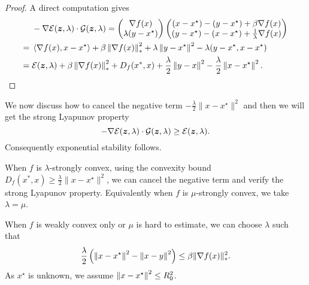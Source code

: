 \documentclass[10pt]{amsart}
\begin{document}
\begin{proof}
A direct computation gives 
\begin{equation}\label{eq:A-HNAG}
\begin{split}
	&-\nabla \mathcal E(\boldsymbol z, \lambda) \cdot \mathcal G(\boldsymbol z, \lambda) 
= 
\begin{pmatrix}
\nabla f(x)\\
 \lambda (y-x^{\star})
\end{pmatrix}
\begin{pmatrix}
(x-x^{\star}) - (y - x^{\star})+\beta\nabla f(x)\\ 
(y - x^{\star})- (x-x^{\star}) +\frac{1}{\lambda}\nabla f(x)\\ 
\end{pmatrix}
	\\
	={}& \left\langle {\nabla f(x),x-x^{\star}} \right\rangle + \beta\left\lVert {\nabla f(x)} \right\rVert_*^2+ \lambda\left\lVert {y-x^{\star}} \right\rVert^2 -\lambda (y-x^{\star}, x - x^{\star})\\
=	{}&  \mathcal E(\boldsymbol z, \lambda)+ \beta \left\lVert {\nabla f(x)} \right\rVert_*^2  +  D_f(x^*, x)  +\frac{\lambda}{2}\left\lVert {y-x} \right\rVert^2 -\frac{\lambda}{2}\left\lVert {x - x^{\star}} \right\rVert^2.	
\end{split}
\end{equation}
\end{proof}

We now discuss how to cancel the negative term $- \frac{\lambda}{2} \|x-x^{\star}\|^2$ and 
then we will get the strong Lyapunov property
$$
-\nabla \mathcal E(\boldsymbol z, \lambda) \cdot \mathcal G(\boldsymbol z, \lambda) \geq \mathcal E(\boldsymbol z, \lambda).
$$
Consequently exponential stability follows.

When $f$ is $\lambda$-strongly convex, using the convexity bound  $D_f(x^*, x)\geq \frac{\lambda}{2} \|x-x^{\star}\|^2$, we can cancel the negative term and verify the strong Lyapunov property. Equivalently when $f$ is $\mu$-strongly convex, we take $\lambda =\mu$. 

%
When $f$ is weakly convex only or $\mu$ is hard to estimate, 
we can choose $\lambda$ such that
\begin{equation}
\frac{\lambda}{2}\left (\left\lVert {x-x^{\star}} \right\rVert^2 - \left\lVert {x-y} \right\rVert^2\right )\leq \beta\| \nabla f(x)\|_*^2. 
\end{equation}
As $x^{\star}$ is unknown, we assume $\left\lVert {x-x^{\star}} \right\rVert^2 \leq R_0^2$. 
\end{document}

